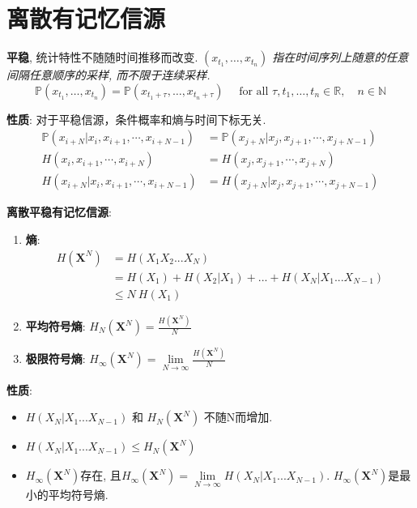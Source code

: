 \documentclass{article}
\newcommand{\env}[2]{\begin{#1}#2\end{#1}}
\newcommand{\defi}[2]{\textbf{#1}, #2}
\newcommand{\bb}{\boldsymbol}
\newcommand{\P}{\mathbb P}
\newcommand{\l}{\left}
\newcommand{\r}{\right}
\begin{document}
    \section{离散有记忆信源}
            
            \defi{平稳}{统计特性不随随时间推移而改变. \textit{$\l(x_{t_1}, \ldots, x_{t_{n}}\r)$ 指在时间序列上随意的任意间隔任意顺序的采样, 而不限于连续采样.}
                $$ \P\l(x_{t_1}, \ldots, x_{t_{n}}\r) = \P\l(x_{t_1+\tau}, \ldots, x_{t_{n}+\tau}\r) \quad \text { for all } \tau, t_1, \ldots, t_{n} \in \mathbb{R}, \quad n \in \mathbb{N}$$
            }
                
                \textbf{性质}: 
                    对于平稳信源，条件概率和熵与时间下标无关.
                        \env{align*}{
                            \P\l(x_{i+N}|x_{i}, x_{i+1}, \cdots, x_{i+N-1}\r) &= \P\l(x_{j+N}|x_{j}, x_{j+1}, \cdots, x_{j+N-1}\r) \tag{条件概率}\\
                            H\l(x_{i}, x_{i+1}, \cdots, x_{i+N}\r) &= H\l(x_{j}, x_{j+1}, \cdots, x_{j+N}\r) \tag{熵}\\
                            H\l(x_{i+N}|x_{i}, x_{i+1}, \cdots, x_{i+N-1}\r) &= H\l(x_{j+N}|x_{j}, x_{j+1}, \cdots, x_{j+N-1}\r) \tag{条件熵}
                        }
                        
            \textbf{离散平稳有记忆信源}:
                \env{enumerate}{
                \item \textbf{熵}:
                    \env{align*}{
                        H(\bb X^N) 
                        &= H(X_1 X_2 ... X_N) \tag{定义}\\
                        &= H(X_1) + H(X_2|X_1) + ... + H(X_N | X_1 ... X_{N-1}) \tag{条件熵展开}\\
                        &\le N\ H(X_1) \tag{熵的不增原理}
                    }
                \item \textbf{平均符号熵}: $H_N(\bb X^N) = \frac{H(\bb X^N)}{N}$
                \item \textbf{极限符号熵}: $H_\infty(\bb X^N) = \lim\limits_{N \to \infty} \frac{H(\bb X^N)}{N}$
                }
                
                \textbf{性质}: 
                    \env{itemize}{
                    \item $H(X_N | X_1 ... X_{N-1})$ 和 $H_N(\bb X^N)$ 不随N而增加.
                    \item $H(X_N | X_1 ... X_{N-1}) \le H_N(\bb X^N)$
                    \item $H_\infty(\bb X^N)$存在, 且$H_\infty(\bb X^N) = \lim\limits_{N \to \infty} H(X_N | X_1 ... X_{N-1})$. $H_\infty(\bb X^N)$是最小的平均符号熵.
                    }
                
\end{document}
